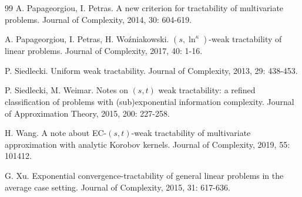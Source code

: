 \documentclass{amsart}
\numberwithin{equation}{section}
\begin{document}
\begin{thebibliography}{99}
 A. Papageorgiou, I. Petras. A new criterion for tractability of multivariate problems. Journal of Complexity, 2014, 30: 604-619.

 A. Papageorgiou, I. Petras, H. Wo\'zniakowski. $(s,\ln^{\kappa})$-weak tractability of linear problems.
Journal of Complexity, 2017, 40: 1-16.

 P. Siedlecki. Uniform weak tractability. Journal of Complexity, 2013, 29: 438-453.

 P. Siedlecki, M. Weimar. Notes on $(s,t)$ weak tractability: a refined classification of problems with
(sub)exponential information complexity. Journal of Approximation Theory, 2015, 200: 227-258.

 H. Wang. A note about EC-$(s,t)$-weak tractability of multivariate approximation with analytic Korobov kernels.
 Journal of Complexity, 2019, 55: 101412.

 G. Xu. Exponential convergence-tractability of general linear problems in the average case setting.
Journal of Complexity, 2015, 31: 617-636.

\end{thebibliography}
\end{document}
